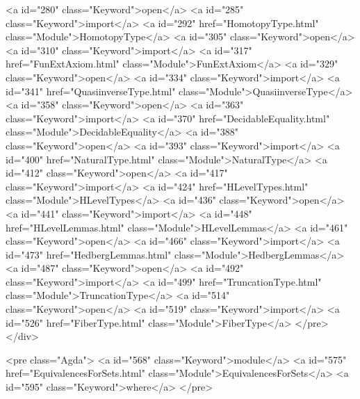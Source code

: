 <a id="280" class="Keyword">open</a> <a id="285" class="Keyword">import</a> <a id="292" href="HomotopyType.html" class="Module">HomotopyType</a>
<a id="305" class="Keyword">open</a> <a id="310" class="Keyword">import</a> <a id="317" href="FunExtAxiom.html" class="Module">FunExtAxiom</a>
<a id="329" class="Keyword">open</a> <a id="334" class="Keyword">import</a> <a id="341" href="QuasiinverseType.html" class="Module">QuasiinverseType</a>
<a id="358" class="Keyword">open</a> <a id="363" class="Keyword">import</a> <a id="370" href="DecidableEquality.html" class="Module">DecidableEquality</a>
<a id="388" class="Keyword">open</a> <a id="393" class="Keyword">import</a> <a id="400" href="NaturalType.html" class="Module">NaturalType</a>
<a id="412" class="Keyword">open</a> <a id="417" class="Keyword">import</a> <a id="424" href="HLevelTypes.html" class="Module">HLevelTypes</a>
<a id="436" class="Keyword">open</a> <a id="441" class="Keyword">import</a> <a id="448" href="HLevelLemmas.html" class="Module">HLevelLemmas</a>
<a id="461" class="Keyword">open</a> <a id="466" class="Keyword">import</a> <a id="473" href="HedbergLemmas.html" class="Module">HedbergLemmas</a>
<a id="487" class="Keyword">open</a> <a id="492" class="Keyword">import</a> <a id="499" href="TruncationType.html" class="Module">TruncationType</a>
<a id="514" class="Keyword">open</a> <a id="519" class="Keyword">import</a> <a id="526" href="FiberType.html" class="Module">FiberType</a>
</pre>
</div>

<pre class="Agda">
<a id="568" class="Keyword">module</a> <a id="575" href="EquivalencesForSets.html" class="Module">EquivalencesForSets</a> <a id="595" class="Keyword">where</a>
</pre>


